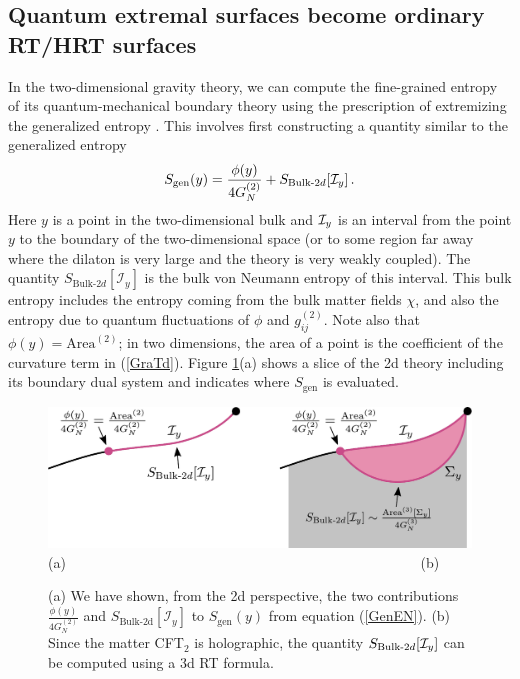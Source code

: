 \documentclass[11pt]{article}
\def\la{\label}
\def\nref#1{(\ref{#1})}
\begin{document}
\subsection{Quantum extremal surfaces become ordinary RT/HRT surfaces}

In the two-dimensional gravity theory, we can compute the fine-grained entropy  of its quantum-mechanical boundary theory using the prescription of extremizing the generalized entropy \cite{Engelhardt:2014gca}. 
This involves first constructing a quantity similar to the generalized entropy 
\begin{align} \la{GenEN}
S_\mathrm{gen}(y) =  \frac{\phi(y)}{4G_{N}^{(2)}} + S_{\mathrm{Bulk}\text{-}2d}  [{\cal I}_y] \, .
\end{align} 
Here $y$ is a point in the two-dimensional bulk and ${\cal I}_y$ is an interval from the point $y$ to the boundary of the two-dimensional space (or to  some region far away where the dilaton is very large and the theory is very weakly coupled). 
The quantity $S_{\mathrm{Bulk}\text{-}2d}[\mathcal{I}_y]$
is the bulk von Neumann entropy of this interval. 
This bulk entropy includes the entropy coming from the bulk matter fields $\chi$, and also the entropy due to quantum fluctuations of $\phi$ and $g_{ij}^{(2)}$.
Note also that $\phi(y) = \text{Area}^{(2)}$; in two dimensions, the area of a point is the coefficient of the curvature term in \nref{GraTd}.
Figure \ref{3dsgen}(a) shows a slice of the 2d theory including its boundary dual system and indicates where $S_{\text{gen}}$ is evaluated.
\begin{figure}[t]
    \begin{center}
    \includegraphics[scale=.6]{Figures/3dsgen}
 \\ (a) ~~~~~~~~~~~~~~~~~~~~~~~~~~~~~~~~~~~~~~~~~~~~~~~~~~(b) 
    \end{center}
    \caption{(a) We have shown, from the 2d perspective, the two contributions $\frac{\phi(y)}{4G_N^{(2)}}$ and $S_\text{Bulk-2d}[\mathcal{I}_y]$ to $S_\text{gen}(y)$ from equation (\ref{GenEN}). (b)  Since the matter CFT$_2$ is holographic, the quantity $S_{\mathrm{Bulk}\text{-}2d}  [{\cal I}_y]$ can be computed using a 3d RT formula.}
    \label{3dsgen}
\end{figure}
\end{document}
